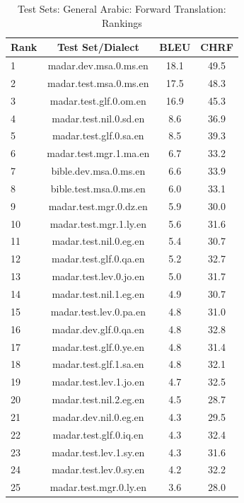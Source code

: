 \begin{table}[htbp]
\centering
\caption{Test Sets: General Arabic: Forward Translation: Rankings}
\label{tab:testset_ranking_forward_arabic_general}
\begin{tabular}{l@{\hspace{3pt}}c@{\hspace{3pt}}c@{\hspace{3pt}}c}
\toprule
Rank & Test Set/Dialect & BLEU & CHRF \\
\midrule
1 & madar.dev.msa.0.ms.en & 18.1 & 49.5 \\
2 & madar.test.msa.0.ms.en & 17.5 & 48.3 \\
3 & madar.test.glf.0.om.en & 16.9 & 45.3 \\
4 & madar.test.nil.0.sd.en & 8.6 & 36.9 \\
5 & madar.test.glf.0.sa.en & 8.5 & 39.3 \\
6 & madar.test.mgr.1.ma.en & 6.7 & 33.2 \\
7 & bible.dev.msa.0.ms.en & 6.6 & 33.9 \\
8 & bible.test.msa.0.ms.en & 6.0 & 33.1 \\
9 & madar.test.mgr.0.dz.en & 5.9 & 30.0 \\
10 & madar.test.mgr.1.ly.en & 5.6 & 31.6 \\
11 & madar.test.nil.0.eg.en & 5.4 & 30.7 \\
12 & madar.test.glf.0.qa.en & 5.2 & 32.7 \\
13 & madar.test.lev.0.jo.en & 5.0 & 31.7 \\
14 & madar.test.nil.1.eg.en & 4.9 & 30.7 \\
15 & madar.test.lev.0.pa.en & 4.8 & 31.0 \\
16 & madar.dev.glf.0.qa.en & 4.8 & 32.8 \\
17 & madar.test.glf.0.ye.en & 4.8 & 31.4 \\
18 & madar.test.glf.1.sa.en & 4.8 & 32.1 \\
19 & madar.test.lev.1.jo.en & 4.7 & 32.5 \\
20 & madar.test.nil.2.eg.en & 4.5 & 28.7 \\
21 & madar.dev.nil.0.eg.en & 4.3 & 29.5 \\
22 & madar.test.glf.0.iq.en & 4.3 & 32.4 \\
23 & madar.test.lev.1.sy.en & 4.3 & 31.6 \\
24 & madar.test.lev.0.sy.en & 4.2 & 32.2 \\
25 & madar.test.mgr.0.ly.en & 3.6 & 28.0 \\

\end{tabular}
\end{table}
